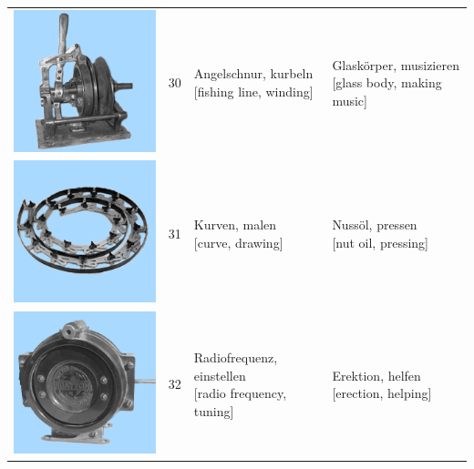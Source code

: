 \documentclass[
  english,
  doc,12pt,twoside,floatsintext]{apa7}
\begin{document}
\begin{center}
\begin{ThreePartTable}
{\begin{longtable}{llll}
\includegraphics[valign=c, scale=0.23]{../materials/unfamiliar/30.png} & 30 & \makecell[l]{Angelschnur, kurbeln\\{[fishing line, winding]}} & \makecell[l]{Glaskörper, musizieren\\{[glass body, making music]}}\\
\includegraphics[valign=c, scale=0.23]{../materials/unfamiliar/31.png} & 31 & \makecell[l]{Kurven, malen\\{[curve, drawing]}} & \makecell[l]{Nussöl, pressen\\{[nut oil, pressing]}}\\
\includegraphics[valign=c, scale=0.23]{../materials/unfamiliar/32.png} & 32 & \makecell[l]{Radiofrequenz, einstellen\\{[radio frequency, tuning]}} & \makecell[l]{Erektion, helfen\\{[erection, helping]}}\\

\end{longtable}}
\end{ThreePartTable}
\end{center}
\end{document}
